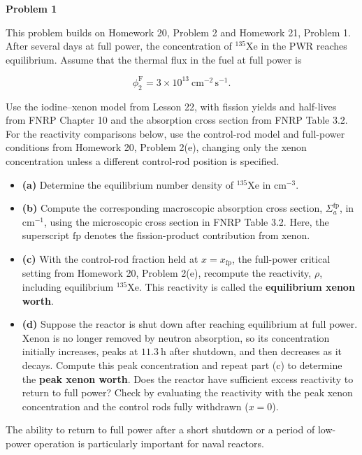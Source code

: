 \noindent\textbf{Problem 1}

This problem builds on Homework 20, Problem 2 and Homework 21, Problem 1. After several days at full power, the concentration of \({}^{135}\mathrm{Xe}\) in the PWR reaches equilibrium. Assume that the thermal flux in the fuel at full power is

\[
\phi^{\mathrm{F}}_2=3\times10^{13}~\mathrm{cm^{-2}\,s^{-1}}.
\]

Use the iodine--xenon model from Lesson 22, with fission yields and half-lives from FNRP Chapter 10 and the absorption cross section from FNRP Table 3.2. For the reactivity comparisons below, use the control-rod model and full-power conditions from Homework 20, Problem 2(e), changing only the xenon concentration unless a different control-rod position is specified.

\begin{itemize}
\tightlist
\item
  \textbf{(a)} Determine the equilibrium number density of \({}^{135}\mathrm{Xe}\) in \(\mathrm{cm^{-3}}\).
\item
  \textbf{(b)} Compute the corresponding macroscopic absorption cross section, \(\Sigma_a^{\mathrm{fp}}\), in \(\mathrm{cm^{-1}}\), using the microscopic cross section in FNRP Table 3.2. Here, the superscript \(\mathrm{fp}\) denotes the fission-product contribution from xenon.
\item
  \textbf{(c)} With the control-rod fraction held at \(x=x_{\mathrm{fp}}\), the full-power critical setting from Homework 20, Problem 2(e), recompute the reactivity, \(\rho\), including equilibrium \({}^{135}\mathrm{Xe}\). This reactivity is called the \textbf{equilibrium xenon worth}.
\item
  \textbf{(d)} Suppose the reactor is shut down after reaching equilibrium at full power. Xenon is no longer removed by neutron absorption, so its concentration initially increases, peaks at \(11.3~\mathrm{h}\) after shutdown, and then decreases as it decays. Compute this peak concentration and repeat part (c) to determine the \textbf{peak xenon worth}. Does the reactor have sufficient excess reactivity to return to full power? Check by evaluating the reactivity with the peak xenon concentration and the control rods fully withdrawn (\(x=0\)).
\end{itemize}

The ability to return to full power after a short shutdown or a period of low-power operation is particularly important for naval reactors.

